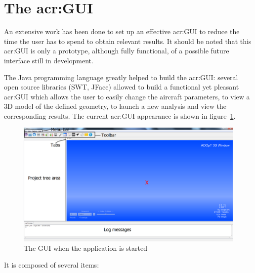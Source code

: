 \section{The \gls{acr:GUI}}
\label{par:GUI}
An extensive work has been done to set up an effective \gls{acr:GUI} to reduce the time the user has to spend to obtain relevant results. It should be noted that this \gls{acr:GUI} is only a prototype, although fully functional, of a possible future interface still in development.

\bigskip
\noindent
The Java programming language greatly helped to build the \gls{acr:GUI}: several open source libraries (SWT, JFace) allowed to build a functional yet pleasant \gls{acr:GUI} which allows the user to easily change the aircraft parameters, to view a 3D model of the defined geometry, to launch a new analysis and view the corresponding results. The current \gls{acr:GUI} appearance is shown in figure~\ref{fig:guiStart}. 
%
\begin{figure}[h]
	\centering
	\includegraphics[width=\textwidth]{images/gui/applicationStart}
	\caption{The GUI when the application is started}
	\label{fig:guiStart}
\end{figure}
%
It is composed of several items:
